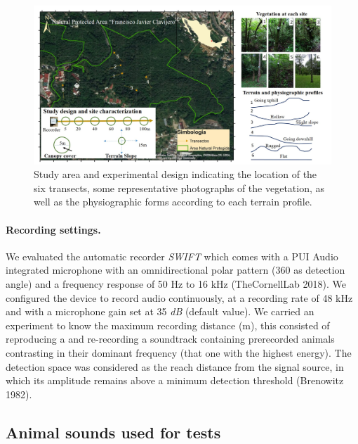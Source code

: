\documentclass[fleqn,10pt,lineno]{wlpeerj} %
\begin{document}
\begin{figure}

{\centering \includegraphics[width=1\linewidth]{RD_studyarea} 

}

\caption{Study area and experimental design indicating the location of the six transects, some representative photographs of the vegetation, as well as the physiographic forms according to each terrain profile.\label{fig:studyarea}}\label{fig:studyarea}
\end{figure}

\paragraph{Recording settings.}

We evaluated the automatic recorder \emph{SWIFT} which comes with a PUI
Audio integrated microphone with an omnidirectional polar pattern (360
as detection angle) and a frequency response of 50 Hz to 16 kHz
(TheCornellLab 2018). We configured the device to record audio
continuously, at a recording rate of 48 kHz and with a microphone gain
set at 35 \emph{dB} (default value). We carried an experiment to know
the maximum recording distance (m), this consisted of reproducing a and
re-recording a soundtrack containing prerecorded animals contrasting in
their dominant frequency (that one with the highest energy). The
detection space was considered as the reach distance from the signal
source, in which its amplitude remains above a minimum detection
threshold (Brenowitz 1982).

\hypertarget{animal-sounds-used-for-tests}{%
\subsection*{Animal sounds used for
tests}\label{animal-sounds-used-for-tests}}
\end{document}

